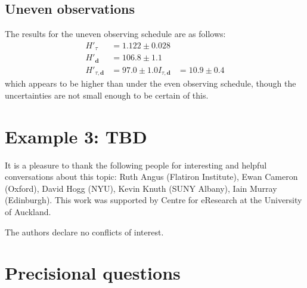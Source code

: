 \documentclass[entropy,article,submit,oneauthor,pdftex,10pt,a4paper]{mdpi}
\renewcommand{\d}{\boldsymbol{d}}
\begin{document}
\subsection{Uneven observations}
The results for the uneven observing schedule are as follows:
\begin{align}
H'_{\tau}     &= 1.122 \pm 0.028 \\
H'_{\d}       &= 106.8 \pm 1.1   \\
H'_{\tau, \d} &= 97.0 \pm 1.0
I_{\tau, \d} &= 10.9 \pm 0.4
\end{align}
which appears to be higher than under the even observing schedule,
though the uncertainties
are not small enough to be certain of this.

\section{Example 3: TBD}

It is a pleasure to thank the following people for interesting and helpful
conversations about this topic: Ruth Angus (Flatiron Institute),
Ewan Cameron (Oxford), David Hogg (NYU), Kevin Knuth (SUNY Albany),
Iain Murray (Edinburgh). This work was supported by Centre for eResearch
at the University of Auckland.




The authors declare no conflicts of interest.

%
\makeatletter
\renewcommand\@biblabel[1]{#1. }
\makeatother





\appendix
\section{Precisional questions}
\end{document}
